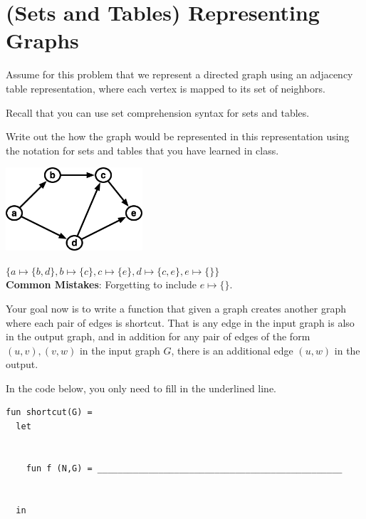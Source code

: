 \section{(Sets and Tables) Representing Graphs}


\begin{problem}

Assume for this problem that we represent a directed graph using an
adjacency table representation, where each vertex is mapped to its set
of neighbors. 

Recall that you can use set comprehension syntax for sets and tables.

\ask[5]
Write out the how the graph would be represented in this
representation using the notation for sets and tables that you have
learned in class.

\begin{center}
\includegraphics[width=2in]{media/digraph-1.jpg}
\end{center}

\sol
$\{a \mapsto \{b,d\}, b \mapsto \{c\}, c \mapsto \{e\}, d \mapsto \{c,e\}, e \mapsto \{\} \}$ \\

\notes
\textbf{Common Mistakes}: Forgetting to include $e \mapsto \{\}$. 


\ask[12]
Your goal now is to write a function that given a graph creates
another graph where each pair of edges is shortcut.  That is any edge
in the input graph is also in the output graph, and in addition for
any pair of edges of the form $(u,v),(v,w)$ in the input graph $G$,
there is an additional edge $(u,w)$ in the output.

In the code below, you only need to fill in the underlined line. 

\begin{lstlisting}[numbers=none]
fun shortcut(G) = 
  let 


    fun f (N,G) = ________________________________________________


  in   


\end{lstlisting}
\end{problem}
